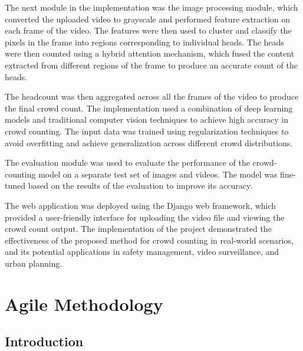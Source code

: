 \documentclass[12pt]{report}
\begin{document}
The next module in the implementation was the image processing module, which converted the uploaded video to grayscale and performed feature extraction on each frame of the video. The features were then used to cluster and classify the pixels in the frame into regions corresponding to individual heads. The heads were then counted using a hybrid attention mechanism, which fused the content extracted from different regions of the frame to produce an accurate count of the heads.
\newline

The headcount was then aggregated across all the frames of the video to produce the final crowd count. The implementation used a combination of deep learning models and traditional computer vision techniques to achieve high accuracy in crowd counting. The input data was trained using regularization techniques to avoid overfitting and achieve generalization across different crowd distributions.
\newline

The evaluation module was used to evaluate the performance of the crowd-counting model on a separate test set of images and videos. The model was fine-tuned based on the results of the evaluation to improve its accuracy.
\newline

The web application was deployed using the Django web framework, which provided a user-friendly interface for uploading the video file and viewing the crowd count output. The implementation of the project demonstrated the effectiveness of the proposed method for crowd counting in real-world scenarios, and its potential applications in safety management, video surveillance, and urban planning.
\newline



\chapter{Agile Methodology}

\section{Introduction}
\end{document}
